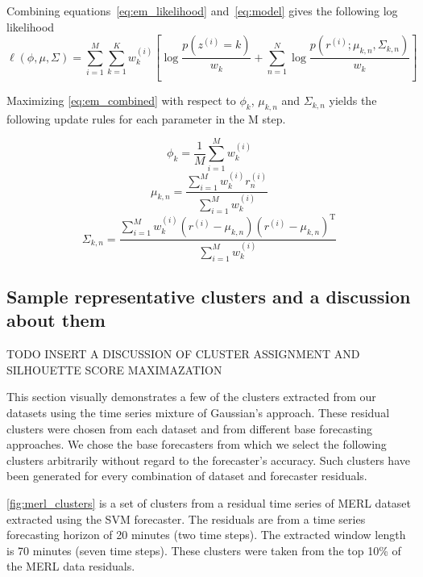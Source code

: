Combining equations~\ref{eq:em_likelihood} and~\ref{eq:model} gives the following log likelihood
\begin{equation}
\label{eq:em_combined}
\ell(\phi, \mu, \Sigma) = \sum_{i = 1}^{M}\sum_{k = 1}^{K}w_{k}^{(i)} [\log \frac{p(z^{(i)} = k)}{w_{k}} + \sum_{n = 1}^{N} \log \frac{p(r^{(i)}; \mu_{k, n}, \Sigma_{k, n})}{w_{k}}]
\end{equation}

Maximizing \ref{eq:em_combined} with respect to $\phi_{k}$, $\mu_{k, n}$ and $\Sigma_{k, n}$ yields the following update rules for each parameter in the M step.

\begin{equation}
\phi_{k} = \frac{1}{M}\sum_{i = 1}^{M}w_{k}^{(i)}
\end{equation}
\begin{equation}
\mu_{k, n} = \frac{\sum_{i = 1}^{M}w_{k}^{(i)}r^{(i)}_{n}}{\sum_{i = 1}^{M}w_{k}^{(i)}}
\end{equation}
\begin{equation}
\Sigma_{k, n} = \frac{\sum_{i = 1}^{M}w_{k}^{(i)}(r^{(i)} - \mu_{k, n})(r^{(i)} - \mu_{k, n})^{\mathrm{T}}}{\sum_{i = 1}^{M}w_{k}^{(i)}}
\end{equation}


\subsection{Sample representative clusters and a discussion about them}

TODO INSERT A DISCUSSION OF CLUSTER ASSIGNMENT AND SILHOUETTE SCORE MAXIMAZATION

This section visually demonstrates a few of the clusters extracted from our datasets using the time series mixture of Gaussian's approach.  These residual clusters were chosen from each dataset and from different base forecasting approaches.  We chose the base forecasters from which we select the following clusters arbitrarily without regard to the forecaster's accuracy.  Such clusters have been generated for every combination of dataset and forecaster residuals.  

\ref{fig:merl_clusters} is a set of clusters from a residual time series of MERL dataset extracted using the SVM forecaster.  The residuals are from a time series forecasting horizon of 20 minutes (two time steps).  The extracted window length is 70 minutes (seven time steps).  These clusters were taken from the top 10\% of the MERL data residuals.

